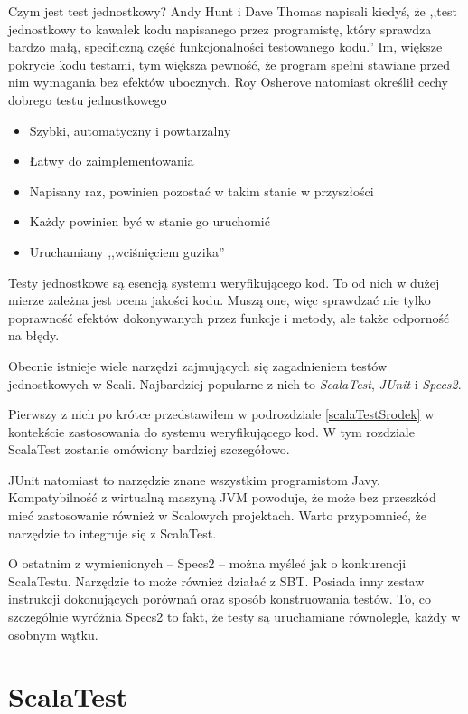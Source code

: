 \documentclass[brudnopis]{xmgr}
\begin{document}
Czym jest test jednostkowy? Andy Hunt i Dave Thomas napisali kiedyś, że ,,test jednostkowy to kawałek kodu napisanego przez programistę, który sprawdza bardzo małą, specificzną część funkcjonalności testowanego kodu.''\cite[s.3]{Hunt:2003:PUT} Im, większe pokrycie kodu testami, tym większa pewność, że program spełni stawiane przed nim wymagania bez efektów ubocznych. Roy Osherove natomiast określił cechy dobrego testu jednostkowego\cite[s. 6]{Osherove:2009:TAOUT} 

\begin{itemize}
\item Szybki, automatyczny i powtarzalny
\item Łatwy do zaimplementowania
\item Napisany raz, powinien pozostać w takim stanie w przyszłości
\item Każdy powinien być w stanie go uruchomić
\item Uruchamiany ,,wciśnięciem guzika'' 
\end{itemize}

Testy jednostkowe są esencją systemu weryfikującego kod. To od nich w dużej mierze zależna jest ocena jakości kodu. Muszą one, więc sprawdzać nie tylko poprawność efektów dokonywanych przez funkcje i metody, ale także odporność na błędy.  

Obecnie istnieje wiele narzędzi zajmujących się zagadnieniem testów jednostkowych w Scali. Najbardziej popularne z nich to \emph{ScalaTest}, \emph{JUnit} i \emph{Specs2}.

Pierwszy z nich po krótce przedstawiłem w podrozdziale \ref{scalaTestSrodek} w kontekście zastosowania do systemu weryfikującego kod. W tym rozdziale ScalaTest zostanie omówiony bardziej szczegółowo. 

JUnit natomiast to narzędzie znane wszystkim programistom Javy. Kompatybilność z wirtualną maszyną JVM powoduje, że może bez przeszkód mieć zastosowanie również w Scalowych projektach. Warto przypomnieć, że narzędzie to integruje się z ScalaTest. 

O ostatnim z wymienionych -- Specs2 -- można myśleć jak o konkurencji ScalaTestu. Narzędzie to może również działać z SBT. Posiada inny zestaw instrukcji dokonujących porównań oraz sposób konstruowania testów. To, co szczególnie wyróżnia Specs2 to fakt, że testy są uruchamiane równolegle, każdy w osobnym wątku.
      
\section{ScalaTest}
\end{document}

